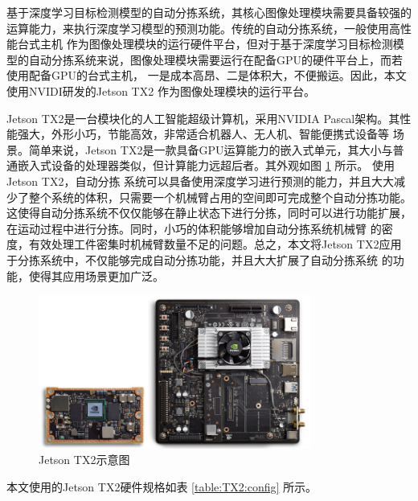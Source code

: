 基于深度学习目标检测模型的自动分拣系统，其核心图像处理模块需要具备较强的运算能力，来执行深度学习模型的预测功能。传统的自动分拣系统，一般使用高性能台式主机
作为图像处理模块的运行硬件平台，但对于基于深度学习目标检测模型的自动分拣系统来说，图像处理模块需要运行在配备GPU的硬件平台上，而若使用配备GPU的台式主机，
一是成本高昂、二是体积大，不便搬运。因此，本文使用NVIDI研发的Jetson TX2 \cite{TX2} 作为图像处理模块的运行平台。

Jetson TX2是一台模块化的人工智能超级计算机，采用NVIDIA Pascal架构。其性能强大，外形小巧，节能高效，非常适合机器人、无人机、智能便携式设备等
场景。简单来说，Jetson TX2是一款具备GPU运算能力的嵌入式单元，其大小与普通嵌入式设备的处理器类似，但计算能力远超后者。其外观如图 \ref{fig:jetson_tx2} 所示。
使用Jetson TX2，自动分拣
系统可以具备使用深度学习进行预测的能力，并且大大减少了整个系统的体积，只需要一个机械臂占用的空间即可完成整个自动分拣功能。
这使得自动分拣系统不仅仅能够在静止状态下进行分拣，同时可以进行功能扩展，在运动过程中进行分拣。同时，小巧的体积能够增加自动分拣系统机械臂
的密度，有效处理工件密集时机械臂数量不足的问题。总之，本文将Jetson TX2应用于分拣系统中，不仅能够完成自动分拣功能，并且大大扩展了自动分拣系统
的功能，使得其应用场景更加广泛。

\begin{figure}[h]
    \centering
    \includegraphics[width=0.8\textwidth]{pic/chap2/jetson_tx2.jpg}
    \caption{Jetson TX2示意图}
    \label{fig:jetson_tx2}
\end{figure}

本文使用的Jetson TX2硬件规格如表 \ref{table:TX2:config} 所示。

